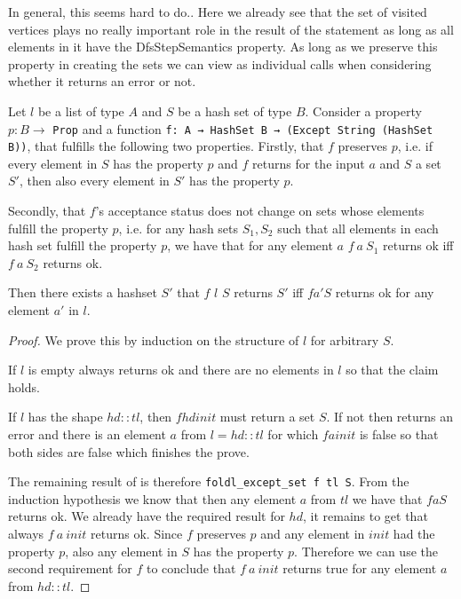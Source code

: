 In general, this seems hard to do..
Here we already see that the set of visited vertices plays no really important role in the result of the statement as long as all elements in it have the DfsStepSemantics property. As long as we preserve this property in creating the sets we can view \foldlexceptset as individual calls when considering whether it returns an error or not.

\begin{lemma}[\foldlexceptsetisok]\label{lem:foldlexceptsetisok}
  Let $l$ be a list of type $A$ and $S$ be a hash set of type $B$. Consider a property $p: B \to$ \lstinline|Prop| and a function \lstinline|f: A → HashSet B → (Except String (HashSet B))|, that fulfills the following two properties.
  Firstly, that $f$ preserves $p$, i.e. if every element in $S$ has the property $p$ and $f$ returns for the input $a$ and $S$ a set $S'$, then also every element in $S'$ has the property $p$.

  Secondly, that $f$'s acceptance status does not change on sets whose elements fulfill the property $p$, i.e. for any hash sets $S_1, S_2$ such that all elements in each hash set fulfill the property $p$, we have that for any element $a$ $f\ a\ S_1$ returns ok iff $f\ a\ S_2$ returns ok.
  
  Then there exists a hashset $S'$ that \foldlexceptset $f$ $l$ $S$ returns $S'$ iff $f a' S$ returns ok for any element $a'$ in $l$.
\end{lemma}
\begin{proof}
  We prove this by induction on the structure of $l$ for arbitrary $S$.

  If $l$ is empty \foldlexceptset always returns ok and there are no elements in $l$ so that the claim holds.

  If $l$ has the shape $hd::tl$, then $f hd init$ must return a set $S$. If not then \foldlexceptset returns an error and there is an element $a$ from $l=hd::tl$ for which $f a init$ is false so that both sides are false which finishes the prove.

  The remaining result of \foldlexceptset is therefore \lstinline|foldl_except_set f tl S|. From the induction hypothesis we know that then any element $a$ from $tl$ we have that $f a S$ returns ok. We already have the required result for $hd$, it remains to get that always $f\ a\ init$ returns ok. Since $f$ preserves $p$ and any element in $init$ had the property $p$, also any element in $S$ has the property $p$. Therefore we can use the second requirement for $f$ to conclude that  $f\ a\ init$ returns true for any element $a$ from $hd::tl$.
\end{proof}

